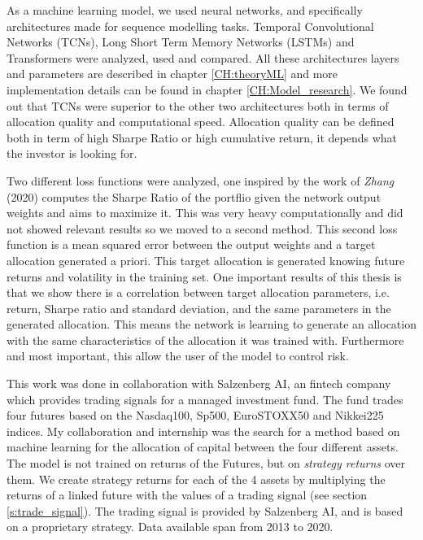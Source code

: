 \hfill \break

As a machine learning model, we used neural networks, and specifically architectures made for sequence modelling tasks. Temporal Convolutional Networks (TCNs), Long Short Term Memory Networks (LSTMs) and Transformers were analyzed, used and compared. All these architectures layers and parameters are described in chapter \ref{CH:theoryML} and more implementation details can be found in chapter \ref{CH:Model_research}. We found out that TCNs were superior to the other two architectures both in terms of allocation quality and computational speed. Allocation quality can be defined both in term of high Sharpe Ratio or high cumulative return, it depends what the investor is looking for.


\hfill \break

Two different loss functions were analyzed, one inspired by the work of \textit{Zhang} (2020) \cite{zhang2019deep} computes the Sharpe Ratio of the portflio given the network output weights and aims to maximize it. This was very heavy computationally and did not showed relevant results so we moved to a second method. This second loss function is a mean squared error between the output weights and a target allocation generated a priori. This target allocation is generated knowing future returns and volatility in the training set. One important results of this thesis is that we show there is a correlation between target allocation parameters, i.e. return, Sharpe ratio and standard deviation, and the same parameters in the generated allocation. This means the network is learning to generate an allocation with the same characteristics of the allocation it was trained with. Furthermore and most important, this allow the user of the model to control risk.

\hfill \break

This work was done in collaboration with Salzenberg AI, an fintech company which provides trading signals for a managed investment fund. The fund trades four futures based on the Nasdaq100, Sp500, EuroSTOXX50 and Nikkei225 indices. My collaboration and internship was the search for a method based on machine learning for the allocation of capital between the four different assets. The model is not trained on returns of the Futures, but on \textit{strategy returns} over them. We create strategy returns for each of the 4 assets by multiplying the returns of a linked future with the values of a trading signal (see section \ref{s:trade_signal}). The trading signal is provided by Salzenberg AI, and is based on a proprietary strategy. Data available span from 2013 to 2020.


